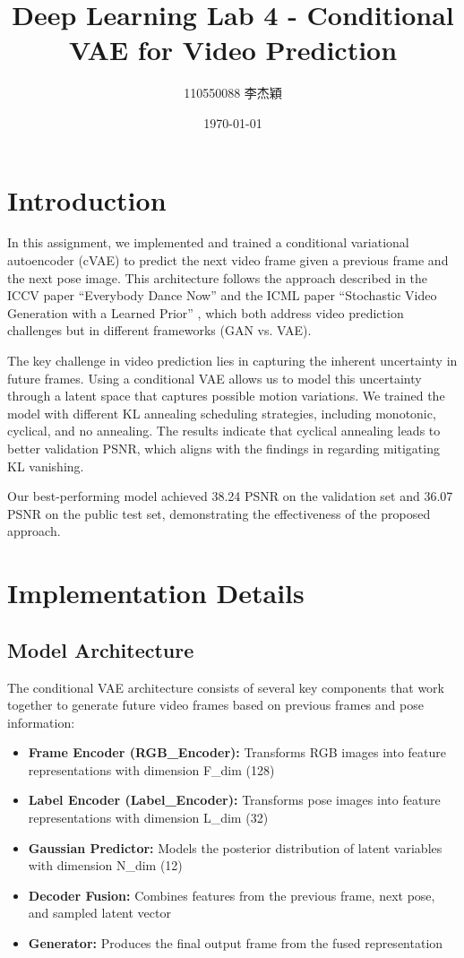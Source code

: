 \documentclass[twocolumn,a4paper]{article}
\title{Deep Learning Lab 4 - Conditional VAE for Video Prediction}
\author{110550088 李杰穎}
\date{\today}
\begin{document}
\maketitle
\section{Introduction}
In this assignment, we implemented and trained a conditional variational autoencoder (cVAE) to predict the next video frame given a previous frame and the next pose image. This architecture follows the approach described in the ICCV paper ``Everybody Dance Now'' \cite{chan2019everybody} and the ICML paper ``Stochastic Video Generation with a Learned Prior'' \cite{denton2018stochastic}, which both address video prediction challenges but in different frameworks (GAN vs. VAE).

The key challenge in video prediction lies in capturing the inherent uncertainty in future frames. Using a conditional VAE allows us to model this uncertainty through a latent space that captures possible motion variations. We trained the model with different KL annealing scheduling strategies, including monotonic, cyclical, and no annealing. The results indicate that cyclical annealing leads to better validation PSNR, which aligns with the findings in \cite{fu2019cyclical} regarding mitigating KL vanishing.

Our best-performing model achieved 38.24 PSNR on the validation set and 36.07 PSNR on the public test set, demonstrating the effectiveness of the proposed approach.

\section{Implementation Details}
\subsection{Model Architecture}

The conditional VAE architecture consists of several key components that work together to generate future video frames based on previous frames and pose information:

\begin{itemize}
    \item \textbf{Frame Encoder (RGB\_Encoder):} Transforms RGB images into feature representations with dimension F\_dim (128)
    \item \textbf{Label Encoder (Label\_Encoder):} Transforms pose images into feature representations with dimension L\_dim (32)
    \item \textbf{Gaussian Predictor:} Models the posterior distribution of latent variables with dimension N\_dim (12)
    \item \textbf{Decoder Fusion:} Combines features from the previous frame, next pose, and sampled latent vector
    \item \textbf{Generator:} Produces the final output frame from the fused representation
\end{itemize}
\end{document}
